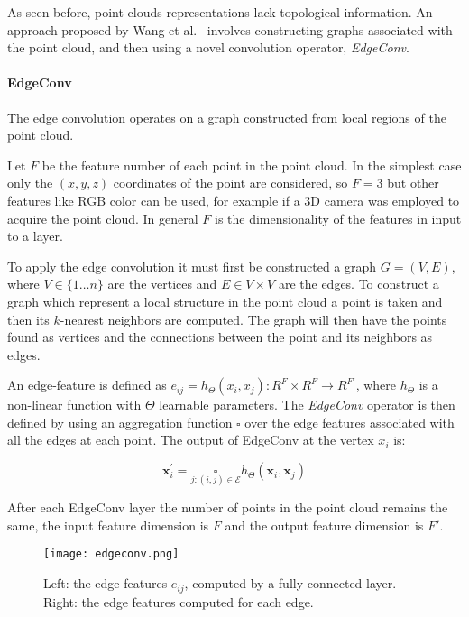 As seen before, point clouds representations lack topological information.
An approach proposed by Wang et al.~\cite{Wang2019} involves constructing graphs associated with the point cloud, and then using a novel convolution operator, \textit{EdgeConv}.

\paragraph{EdgeConv} The edge convolution operates on a graph constructed from local regions of the point cloud.

Let $F$ be the feature number of each point in the point cloud. In the simplest case only the $(x,y,z)$ coordinates of the point are considered, so $F = 3$ but other features like RGB color can be used, for example if a 3D camera was employed to acquire the point cloud. In general $F$ is the dimensionality of the features in input to a layer.

To apply the edge convolution it must first be constructed a graph $G = (V,E)$, where $V \in \{1 \dots n\}$ are the vertices and $E \in V \times V$ are the edges. To construct a graph which represent a local structure in the point cloud a point is taken and then its $k$-nearest neighbors are computed. The graph will then have the points found as vertices and the connections between the point and its neighbors as edges.

An edge-feature is defined as $e_{ij} = h_{\Theta}(x_i, x_j) : R^F \times R^F \rightarrow R^{F'}$, where $h_{\Theta}$ is a non-linear function with $\Theta$ learnable parameters. The \textit{EdgeConv} operator is then defined by using an aggregation function $\square$ over the edge features associated with all the edges at each point. The output of EdgeConv at the vertex $x_i$ is:

\begin{equation}
\mathbf{x}_{i}^{\prime}=\underset{j:(i, j) \in \mathcal{E}}{\square} h_{\Theta}\left(\mathbf{x}_{i}, \mathbf{x}_{j}\right)
\end{equation}

After each EdgeConv layer the number of points in the point cloud remains the same, the input feature dimension is $F$ and the output feature dimension is $F'$.

\begin{figure}[ht]
    \centering
    \texttt{[image: edgeconv.png]}
    \caption{Left: the edge features $e_{ij}$, computed by a fully connected layer. Right: the edge features computed for each edge.~\cite{Wang2019}}
    \label{fig:edgeConvOperator}
\end{figure}

